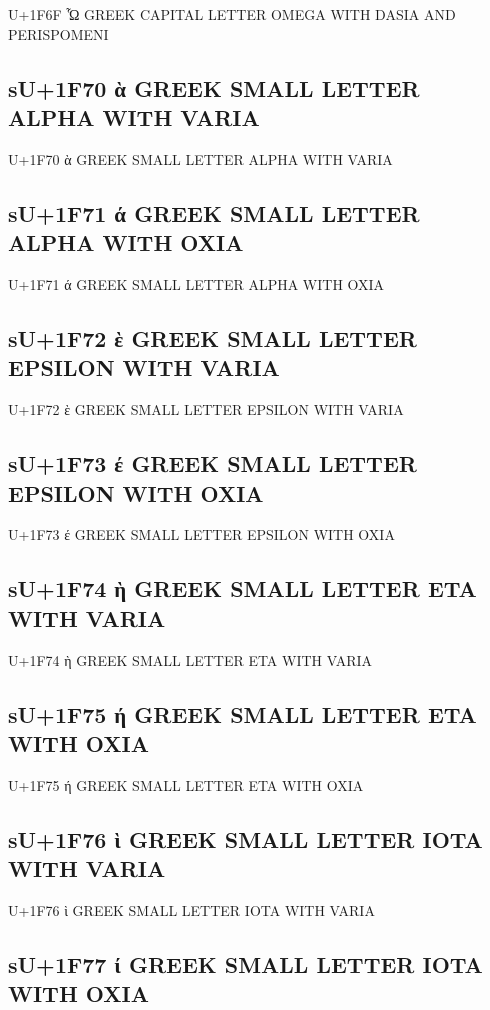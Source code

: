 U+1F6F Ὧ GREEK CAPITAL LETTER OMEGA WITH DASIA AND PERISPOMENI

\subsection{sU+1F70 ὰ GREEK SMALL LETTER ALPHA WITH VARIA}

U+1F70 ὰ GREEK SMALL LETTER ALPHA WITH VARIA

\subsection{sU+1F71 ά GREEK SMALL LETTER ALPHA WITH OXIA}

U+1F71 ά GREEK SMALL LETTER ALPHA WITH OXIA

\subsection{sU+1F72 ὲ GREEK SMALL LETTER EPSILON WITH VARIA}

U+1F72 ὲ GREEK SMALL LETTER EPSILON WITH VARIA

\subsection{sU+1F73 έ GREEK SMALL LETTER EPSILON WITH OXIA}

U+1F73 έ GREEK SMALL LETTER EPSILON WITH OXIA

\subsection{sU+1F74 ὴ GREEK SMALL LETTER ETA WITH VARIA}

U+1F74 ὴ GREEK SMALL LETTER ETA WITH VARIA

\subsection{sU+1F75 ή GREEK SMALL LETTER ETA WITH OXIA}

U+1F75 ή GREEK SMALL LETTER ETA WITH OXIA

\subsection{sU+1F76 ὶ GREEK SMALL LETTER IOTA WITH VARIA}

U+1F76 ὶ GREEK SMALL LETTER IOTA WITH VARIA

\subsection{sU+1F77 ί GREEK SMALL LETTER IOTA WITH OXIA}

